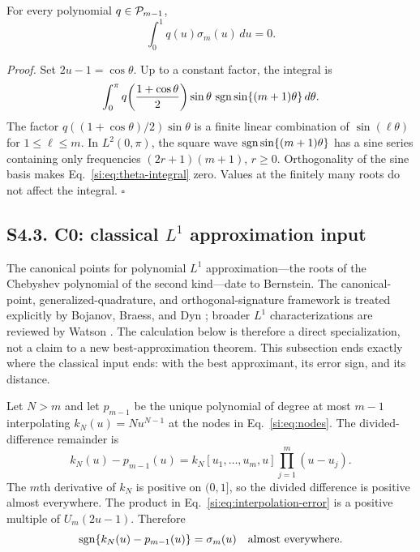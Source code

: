 \begin{lemma}
\label{si:lem:annihilation}
For every polynomial $q\in\mathcal P_{m-1}$,
\begin{equation}
\int_0^1q(u)\sigma_m(u)\,du=0.
\label{si:eq:annihilation}
\end{equation}
\end{lemma}

\noindent\textit{Proof.}
Set $2u-1=\cos\theta$. Up to a constant factor, the integral is
\begin{equation}
\int_0^\pi q\!\left(\frac{1+\cos\theta}{2}\right)
\sin\theta\,\operatorname{sgn}\sin\{(m+1)\theta\}\,d\theta.
\label{si:eq:theta-integral}
\end{equation}
The factor $q((1+\cos\theta)/2)\sin\theta$ is a finite linear combination of $\sin(\ell\theta)$ for $1\le\ell\le m$. In $L^2(0,\pi)$, the square wave $\operatorname{sgn}\sin\{(m+1)\theta\}$ has a sine series containing only frequencies $(2r+1)(m+1)$, $r\ge0$. Orthogonality of the sine basis makes Eq.~\ref{si:eq:theta-integral} zero. Values at the finitely many roots do not affect the integral. \hfill$\square$

\subsection*{S4.3. C0: classical $L^1$ approximation input}

The canonical points for polynomial $L^1$ approximation---the roots of the Chebyshev polynomial of the second kind---date to Bernstein. The canonical-point, generalized-quadrature, and orthogonal-signature framework is treated explicitly by Bojanov, Braess, and Dyn \citep[pp.~335--353]{bojanov1986}; broader $L^1$ characterizations are reviewed by Watson \citep[pp.~1--15]{watson2000}. The calculation below is therefore a direct specialization, not a claim to a new best-approximation theorem. This subsection ends exactly where the classical input ends: with the best approximant, its error sign, and its distance.

Let $N>m$ and let $p_{m-1}$ be the unique polynomial of degree at most $m-1$ interpolating $k_N(u)=Nu^{N-1}$ at the nodes in Eq.~\ref{si:eq:nodes}. The divided-difference remainder is
\begin{equation}
k_N(u)-p_{m-1}(u)
=k_N[u_1,\ldots,u_m,u]\prod_{j=1}^m(u-u_j).
\label{si:eq:interpolation-error}
\end{equation}
The $m$th derivative of $k_N$ is positive on $(0,1]$, so the divided difference is positive almost everywhere. The product in Eq.~\ref{si:eq:interpolation-error} is a positive multiple of $U_m(2u-1)$. Therefore
\begin{equation}
\operatorname{sgn}\{k_N(u)-p_{m-1}(u)\}=\sigma_m(u)
\quad\text{almost everywhere}.
\label{si:eq:error-sign}
\end{equation}

